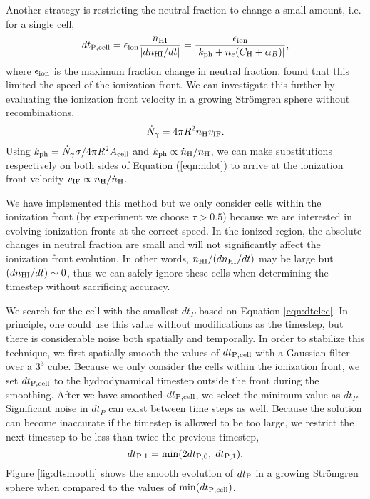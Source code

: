 \documentclass[useAMS,usenatbib]{mn2e}
\begin{document}
Another strategy is restricting the neutral fraction to change a small
amount, i.e. for a single cell,
%
\begin{equation}
  \label{eqn:dtelec}
  dt_{\rm P,cell} = \epsilon_{\rm ion} \frac{n_{\rm HI}}{|dn_{\rm HI}/dt|} =
  \frac{\epsilon_{\rm ion}}{|k_{\rm ph} + n_e (C_{\rm H} + \alpha_B)|},
\end{equation}
where $\epsilon_{\rm ion}$ is the maximum fraction change in neutral
fraction.  \citet{Shapiro04} found that this limited the speed of the
ionization front.  We can investigate this further by evaluating the
ionization front velocity in a growing Str\"{o}mgren sphere without
recombinations, 
\begin{equation}
  \label{eqn:ndot}
  \dot{N}_\gamma = 4 \pi R^2 n_{\rm H} v_{\rm IF}.
\end{equation}
Using $\kph = \dot{N}_\gamma \sigma / 4\pi R^2 A_{\rm cell}$ and $\kph
\propto \dot{n}_{\rm H} / n_{\rm H}$, we can make substitutions
respectively on both sides of Equation (\ref{eqn:ndot}) to arrive at
the ionization front velocity $v_{\rm IF} \propto n_{\rm H}
/\dot{n}_{\rm H}$.

We have implemented this method but we only consider cells within the
ionization front (by experiment we choose $\tau > 0.5$) because we are
interested in evolving ionization fronts at the correct speed.  In the
ionized region, the absolute changes in neutral fraction are small and
will not significantly affect the ionization front evolution.  In
other words, $n_{\rm HI}/(dn_{\rm HI}/dt)$ may be large but $(dn_{\rm
  HI}/dt) \sim 0$, thus we can safely ignore these cells when
determining the timestep without sacrificing accuracy.

We search for the cell with the smallest $dt_P$ based on Equation
\ref{eqn:dtelec}.  In principle, one could use this value without
modifications as the timestep, but there is considerable noise both
spatially and temporally.  In order to stabilize this technique, we
first spatially smooth the values of $dt_{\rm P,cell}$ with a Gaussian
filter over a $3^3$ cube.  Because we only consider the cells within
the ionization front, we set $dt_{\rm P,cell}$ to the hydrodynamical
timestep outside the front during the smoothing.  After we have
smoothed $dt_{\rm P,cell}$, we select the minimum value as $dt_P$.
Significant noise in $dt_P$ can exist between time steps as well.
Because the solution can become inaccurate if the timestep is allowed
to be too large, we restrict the next timestep to be less than twice
the previous timestep,
%
\begin{equation}
  \label{eqn:dtchange}
  dt_{\rm P,1} = \min(2 dt_{\rm P,0},\; dt_{\rm P,1}).
\end{equation}
Figure \ref{fig:dtsmooth} shows the smooth evolution of $dt_{\rm P}$
in a growing Str\"{o}mgren sphere when compared to the values of
$\min(dt_{\rm P,cell})$.
\end{document}
